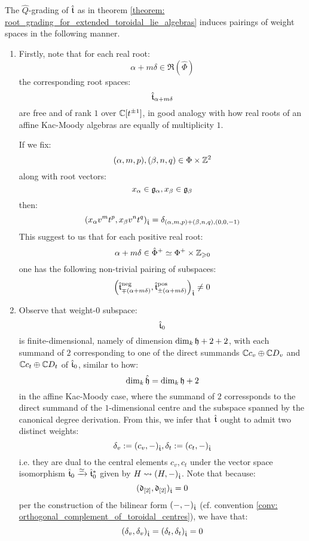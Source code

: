         \begin{remark} \label{remark: toroidal_root_systems}
            The $\hat{Q}$-grading of $\hat{\mathfrak{t}}$ as in theorem \ref{theorem: root_grading_for_extended_toroidal_lie_algebras} induces pairings of weight spaces in the following manner.
            \begin{enumerate}
                \item  Firstly, note that for each real root:
                    $$\alpha + m\delta \in \Re(\hat{\Phi})$$
                the corresponding root spaces:
                    $$\hat{\mathfrak{t}}_{\alpha + m\delta}$$
                are free and of rank $1$ over $\mathbb{C}[t^{\pm 1}]$, in good analogy with how real roots of an affine Kac-Moody algebras are equally of multiplicity $1$.

                If we fix:
                    $$(\alpha, m, p), (\beta, n, q) \in \Phi \x \Z^2$$
                along with root vectors:
                    $$x_{\alpha} \in \mathfrak{g}_{\alpha}, x_{\beta} \in \mathfrak{g}_{\beta}$$
                then:
                    $$( x_{\alpha} v^m t^p, x_{\beta} v^n t^q )_{\hat{\mathfrak{t}}} = \delta_{(\alpha, m, p) + (\beta, n, q), (0, 0, -1)}$$
                This suggest to us that for each positive real root:
                    $$\alpha + m\delta \in \hat{\Phi}^+ \cong \Phi^+ \x \Z_{\geq 0}$$
                one has the following non-trivial pairing of subspaces:
                    $$\left( \hat{\mathfrak{t}}^{\mathrm{neg}}_{\mp (\alpha + m\delta)}, \hat{\mathfrak{t}}^{\mathrm{pos}}_{\pm (\alpha + m\delta)} \right)_{\hat{\mathfrak{t}}} \not = 0$$
                \item Observe that weight-$0$ subspace:
                    $$\hat{\mathfrak{t}}_0$$
                is finite-dimensional, namely of dimension $\dim_{k} \mathfrak{h} + 2 + 2$, with each summand of $2$ corresponding to one of the direct summands $\mathbb{C} c_v \oplus \mathbb{C} D_v$ and $\mathbb{C} c_t \oplus \mathbb{C} D_t$ of $\hat{\mathfrak{t}}_0$, similar to how:
                    $$\dim_{k} \hat{\mathfrak{h}} = \dim_{k} \mathfrak{h} + 2$$
                in the affine Kac-Moody case, where the summand of $2$ corressponds to the direct summand of the $1$-dimensional centre and the subspace spanned by the canonical degree derivation. From this, we infer that $\hat{\mathfrak{t}}$ ought to admit two distinct weights:
                    $$\delta_v := (c_v, -)_{\hat{\mathfrak{t}}}, \delta_t := (c_t, -)_{\hat{\mathfrak{t}}}$$
                i.e. they are dual to the central elements $c_v, c_t$ under the vector space isomorphism $\hat{\mathfrak{t}}_0 \xrightarrow[]{\simeq} \hat{\mathfrak{t}}_0^*$ given by $H \leadsto (H, -)_{\hat{\mathfrak{t}}}$. Note that because:
                    $$(\mathfrak{d}_{[2]}, \mathfrak{d}_{[2]})_{\hat{\mathfrak{t}}} = 0$$
                per the construction of the bilinear form $(-, -)_{\hat{\mathfrak{t}}}$ (cf. convention \ref{conv: orthogonal_complement_of_toroidal_centres}), we have that:
                    $$(\delta_v, \delta_v)_{\hat{\mathfrak{t}}} = (\delta_t, \delta_t)_{\hat{\mathfrak{t}}} = 0$$


\end{enumerate}
\end{remark}
